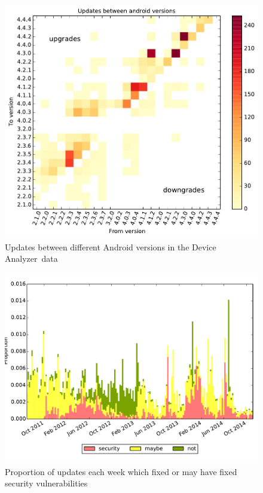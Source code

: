 \documentclass[conference,a4paper,twoside]{IEEEtran}
\newcommand{\da}{Device Analyzer}
\begin{document}
\begin{figure}
 \includegraphics[width=\columnwidth]{figures/from_to_updates.pdf}
 \caption{Updates between different Android versions in the \da\ data}
 \label{fig:from_to_updates}
\end{figure}
\begin{figure}
 \includegraphics[width=\columnwidth]{figures/nw_security_updates.pdf}
 \caption{Proportion of updates each week which fixed or may have fixed security vulnerabilities}
 \label{fig:weekly_security_updates}
\end{figure}
\end{document}
